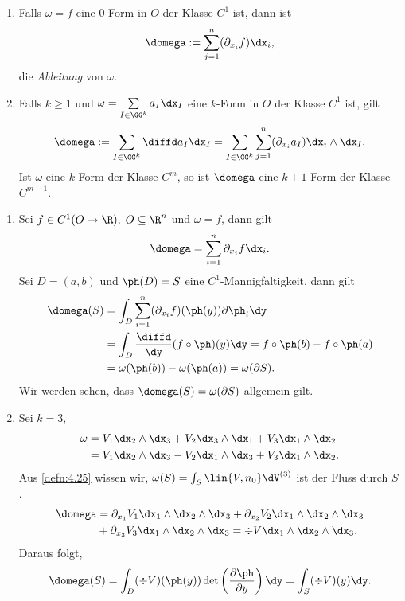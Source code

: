 \begin{prop}[Differentiation]
\begin{enumerate}[label=\arabic{*}.)]
\item Falls $\omega = f$ eine $0$-Form in $O$ der Klasse $C^1$ ist, dann ist
\begin{align*}
\domega := \sum\limits_{j=1}^n (\partial_{x_i} f) \dx_i, 
\end{align*} 
die \emph{Ableitung} von $\omega$.
\item Falls $k\ge 1$ und $\omega = \sum\limits_{I\in\GG^k} a_I\dx_I$ eine
$k$-Form in $O$ der Klasse $C^1$ ist, gilt
\begin{align*}
\domega := \sum\limits_{I\in\GG^k}  \diffd a_I\dx_I
= \sum\limits_{I\in\GG^k}  \sum\limits_{j=1}^n (\partial_{x_i} a_I)
\dx_i\land\dx_I.
\end{align*}
Ist $\omega$ eine $k$-Form der Klasse $C^m$, so ist $\domega$ eine $k+1$-Form
der Klasse $C^{m-1}$.\fishhere
\end{enumerate}
\end{prop}

\begin{bsp}
\label{bsp:4.39}
\begin{enumerate}
\item Sei $f\in C^1(O\to\R),\;O\subseteq\R^n $ und $\omega = f$, dann gilt
\begin{align*}
\domega = \sum\limits_{i=1}^n \partial_{x_i} f \dx_i.
\end{align*} 
Sei $D=(a,b)$ und $\ph(D) = S$ eine $C^1$-Mannigfaltigkeit, dann gilt
\begin{align*}
\domega(S) & = \int_D \sum\limits_{i=1}^n (\partial_{x_i} f)(\ph(y)) \partial
\ph_i \dy \\
& = \int_D \frac{\diffd}{\dy}(f\circ\ph)(y) \dy = f\circ\ph(b) -
f\circ\ph(a) \\ &= \omega(\ph(b)) - \omega(\ph(a)) = \omega(\partial S).
\end{align*}
Wir werden sehen, dass $\domega(S) = \omega(\partial S)$ allgemein gilt.
\item Sei $k=3$,
\begin{align*}
\omega &= V_1\dx_2\land \dx_3 + V_2 \dx_3\land \dx_1 +
V_3\dx_1\land \dx_2 \\ 
&= V_1\dx_2\land \dx_3 - V_2 \dx_1\land \dx_3 +
V_3\dx_1\land \dx_2.
\end{align*}
Aus \ref{defn:4.25} wissen wir, $\omega(S) = \int_S \lin{V,n_0}\dV^{(3)}$ ist
der Fluss durch $S$.
\begin{align*}
\domega &= \partial_{x_1} V_1 \dx_1\land \dx_2 \land \dx_3 + \partial_{x_2} 
V_2 \dx_1\land \dx_2 \land \dx_3 \\ 
&+ \partial_{x_3} V_3  \dx_1\land \dx_2
\land \dx_3 = \div V  \dx_1\land \dx_2 \land \dx_3.
\end{align*}
Daraus folgt,
\begin{align*}
\domega(S) = \int_D (\div V)(\ph(y))\det\left(\frac{\partial \ph}{\partial
y}\right)\dy = \int_S (\div V)(y) \dy.
\end{align*}
\end{enumerate}
\end{bsp}

